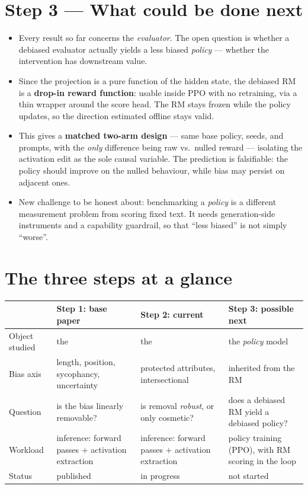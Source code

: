 \documentclass{article}
\begin{document}
\section*{Step 3 --- What could be done next}
\begin{itemize}\itemsep2pt
  \item Every result so far concerns the \emph{evaluator}. The open question is whether a debiased evaluator
        actually yields a less biased \emph{policy} --- whether the intervention has downstream value.
  \item Since the projection is a pure function of the hidden state, the debiased RM is a \textbf{drop-in
        reward function}: usable inside PPO with no retraining, via a thin wrapper around the score head.
        The RM stays frozen while the policy updates, so the direction estimated offline stays valid.
  \item This gives a \textbf{matched two-arm design} --- same base policy, seeds, and prompts, with the
        \emph{only} difference being raw vs.\ nulled reward --- isolating the activation edit as the sole
        causal variable. The prediction is falsifiable: the policy should improve on the nulled behaviour,
        while bias may persist on adjacent ones.
  \item New challenge to be honest about: benchmarking a \emph{policy} is a different measurement problem
        from scoring fixed text. It needs generation-side instruments and a capability guardrail, so that
        ``less biased'' is not simply ``worse''.
\end{itemize}

\section*{The three steps at a glance}
\begin{center}\small
\begin{tabular}{@{}p{2.4cm}p{3.4cm}p{3.4cm}p{3.6cm}@{}}
\toprule
 & \textbf{Step 1: base paper} & \textbf{Step 2: current} & \textbf{Step 3: possible next}\\
\midrule
Object studied & the \rewardmodel{} & the \rewardmodel{} & the \emph{policy} model\\
Bias axis & length, position, sycophancy, uncertainty & protected attributes, intersectional & inherited from the RM\\
Question & is the bias linearly removable? & is removal \emph{robust}, or only cosmetic? & does a debiased RM yield a debiased policy?\\
Workload & inference: forward passes $+$ activation extraction & inference: forward passes $+$ activation extraction & policy training (PPO), with RM scoring in the loop\\
Status & published & in progress & not started\\
\bottomrule
\end{tabular}
\end{center}
\end{document}
